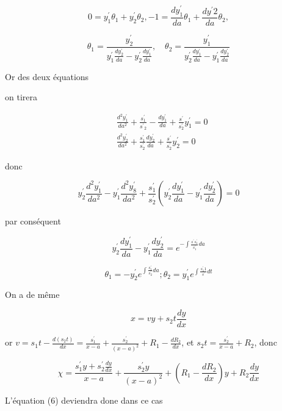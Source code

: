 \documentclass{article}
\begin{document}
\[
0=y_{1}^{\prime} \theta_{1}+y_{2}^{\prime} \theta_{2},-1=\frac{d y_{1}^{\prime}}{d a} \theta_{1}+\frac{d y^{\prime} 2}{d a} \theta_{2},
\]

\[
\theta_{1}=\frac{y_{2}^{\prime}}{y_{1}^{\prime} \frac{d y_{2}^{\prime}}{d a}-y_{2}^{\prime} \frac{d y_{1}^{\prime}}{d a}}, \quad \theta_{2}=\frac{y_{1}^{\prime}}{y_{2}^{\prime} \frac{d y_{1}^{\prime}}{d a}-y_{1}^{\prime} \frac{d y_{2}^{\prime}}{d a}}
\]

Or des deux équations

on tirera

\[
\begin{aligned}
& \frac{d^{2} y_{1}^{\prime}}{d a^{2}}+\frac{s_{1}^{\prime}}{s^{\prime}{ }_{2}}-\frac{d y_{1}^{\prime}}{d a}+\frac{s^{\prime}}{s_{2}^{\prime}} y_{1}^{\prime}=0 \\
& \frac{d^{2} y_{2}^{\prime}}{d a^{2}}+\frac{s_{1}^{\prime}}{s_{2}^{\prime}} \frac{d y_{2}^{\prime}}{d a}+\frac{s^{\prime}}{s_{2}^{\prime}} y_{2}^{\prime}=0
\end{aligned}
\]

donc

\[
y_{2}^{\prime} \frac{d^{2} y_{1}^{\prime}}{d a^{2}}-y_{1}^{\prime} \frac{d^{2} y_{8}^{\prime}}{d a^{2}}+\frac{s_{1}^{\prime}}{s_{2}^{\prime}}\left(y_{2}^{\prime} \frac{d y_{1}^{\prime}}{d a}-y_{1}^{\prime} \frac{d y_{2}^{\prime}}{d a}\right)=0
\]

par conséquent

\[
y_{2}^{\prime} \frac{d y_{1}^{\prime}}{d a}-y_{1}^{\prime} \frac{d y_{2}^{\prime}}{d a}=e^{-\int \frac{s^{\prime} s_{1}^{\prime}}{s_{1}^{\prime}} d a}
\]

\[
\theta_{1}=-y_{2}^{\prime} e^{\int \frac{s_{1}^{\prime}}{s_{2}^{\prime}} d a} ; \theta_{2}=y_{1}^{\prime} e^{\int \frac{s_{1}^{\prime} 1}{s^{\prime}} d t}
\]

On a de même

\[
x=v y+s_{2} t \frac{d y}{d x}
\]

or \(v=s_{1} t-\frac{d\left(s_{2} t\right)}{d x}=\frac{s_{1}^{\prime}}{x-a}+\frac{s_{2}^{\prime}}{(x-a)^{2}}+R_{1}-\frac{d R_{2}}{d x}\), et \(s_{2} t=\frac{s_{2}^{\prime}}{x-a}+R_{2}\), donc

\[
\chi=\frac{s_{1}^{\prime} y+s_{2}^{\prime} \frac{d y}{d x}}{x-a}+\frac{s_{2}^{\prime} y}{(x-a)^{2}}+\left(R_{1}-\frac{d R_{2}}{d x}\right) y+R_{2} \frac{d y}{d x}
\]

L'équation (6) deviendra done dans ce cas
\end{document}
